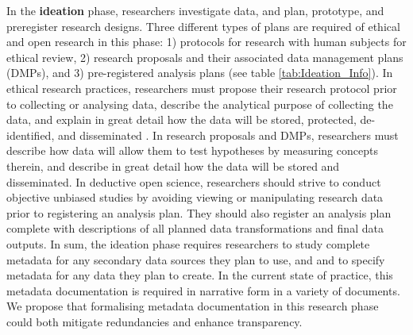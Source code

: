 \documentclass{isprs} %
\begin{document}
In the \textbf{ideation} phase, researchers investigate data, and plan, prototype, and preregister research designs.
Three different types of plans are required of ethical and open research in this phase: 1) protocols for research with human subjects for ethical review, 2) research proposals and their associated data management plans (DMPs), and 3) pre-registered analysis plans (see table \ref{tab:Ideation_Info}).
In ethical research practices, researchers must propose their research protocol prior to collecting or analysing data, describe the analytical purpose of collecting the data, and explain in great detail how the data will be stored, protected, de-identified, and disseminated \citep{DHEW1978}.
In research proposals and DMPs, researchers must describe how data will allow them to test hypotheses by measuring concepts therein, and describe in great detail how the data will be stored and disseminated.
In deductive open science, researchers should strive to conduct objective unbiased studies by avoiding viewing or manipulating research data prior to registering an analysis plan.
They should also register an analysis plan complete with descriptions of all planned data transformations and final data outputs.
In sum, the ideation phase requires researchers to study complete metadata for any secondary data sources they plan to use, and and to specify metadata for any data they plan to create.
In the current state of practice, this metadata documentation is required in narrative form in a variety of documents.
We propose that formalising metadata documentation in this research phase could both mitigate redundancies and enhance transparency.
\end{document}
